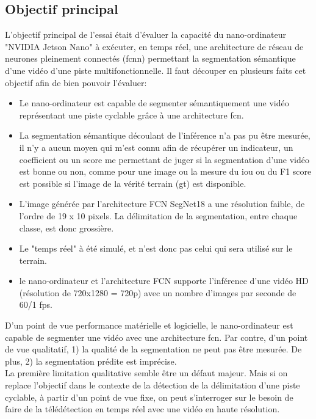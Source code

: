 ﻿\subsection{Objectif principal}
\noindent L'objectif principal de l'essai était d'évaluer la capacité du nano-ordinateur "NVIDIA Jetson Nano" à exécuter, en temps réel, une architecture de réseau de neurones pleinement connectés (\acrshort{fcnn}) permettant la segmentation sémantique d'une vidéo d'une piste multifonctionnelle. Il faut découper en plusieurs faits cet objectif afin de bien pouvoir l'évaluer: 
\begin{itemize}
   \item Le nano-ordinateur est capable de segmenter sémantiquement une vidéo représentant une piste cyclable grâce à une architecture \acrshort{fcn}. 
   \item La segmentation sémantique découlant de l'inférence n'a pas pu être mesurée, il n'y a aucun moyen qui m'est connu afin de récupérer un indicateur, un coefficient ou un score me permettant de juger si la segmentation d'une vidéo est bonne ou non, comme pour une image ou la mesure du \acrshort{iou} ou du F1 score est possible si l'image de la vérité terrain (\acrshort{gt}) est disponible. 
   \item L'image générée par l'architecture FCN SegNet18 a une résolution faible, de l'ordre de 19 x 10 pixels. La délimitation de la segmentation, entre chaque classe, est donc grossière.
   \item Le "temps réel" à été simulé, et n'est donc pas celui qui sera utilisé sur le terrain. 
   \item le nano-ordinateur et l'architecture FCN supporte l'inférence d'une vidéo HD (résolution de 720x1280 = 720p) avec un nombre d'images par seconde de 60/1 \acrshort{fps}.
\end{itemize}
\vspace{0.5\baselineskip}
\noindent D'un point de vue performance matérielle et logicielle, le nano-ordinateur est capable de segmenter une vidéo avec une architecture \acrshort{fcn}. Par contre, d'un point de vue qualitatif, 1) la qualité de la segmentation ne peut pas être mesurée. De plus, 2) la segmentation prédite est imprécise.
\vspace{0.5\baselineskip}
\\
\noindent La première limitation qualitative semble être un défaut majeur. Mais si on replace l'objectif dans le contexte de la détection de la délimitation d'une piste cyclable, à partir d'un point de vue fixe, on peut s'interroger sur le besoin de faire de la télédétection en temps réel avec une vidéo en haute résolution.
